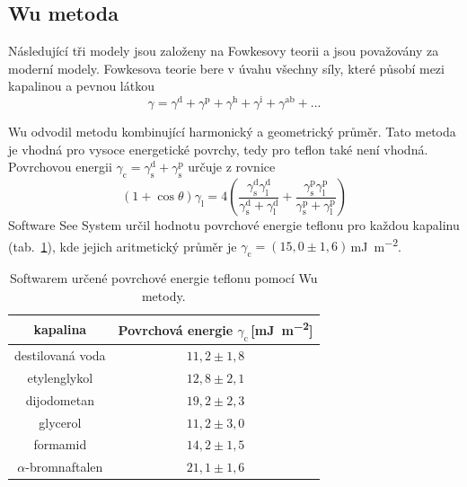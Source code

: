 \documentclass{protokol}
\begin{document}
\subsection{Wu metoda}
\par Následující tři modely jsou založeny na Fowkesovy teorii a jsou považovány 
za moderní modely. Fowkesova teorie bere v úvahu všechny síly, které působí 
mezi kapalinou a pevnou látkou 
\begin{equation}
\gamma = \gamma^\text{d} + \gamma^\text{p} +
\gamma^\text{h} + \gamma^\text{i} + \gamma^\text{ab} + ...
\end{equation}
\par Wu odvodil metodu kombinující harmonický a geometrický průměr. Tato metoda 
je vhodná pro vysoce energetické povrchy, tedy pro teflon také 
není vhodná. Povrchovou energii $\gamma_{\text{c}} = 
\gamma_{\text{s}}^{\text{d}} + \gamma_{\text{s}}^{\text{p}}$ určuje z rovnice
\begin{equation}
	\left(1+\cos\theta\right)\gamma_{\text{l}} = 
	4\left(\frac{\gamma_{\text{s}}^\text{d}\gamma_{\text{l}}^\text{d}}{\gamma_{\text{s}}^\text{d}
		+ \gamma_{\text{l}}^\text{d}} + 
	\frac{\gamma_{\text{s}}^\text{p}\gamma_{\text{l}}^\text{p}}{\gamma_{\text{s}}^\text{p}
		+ \gamma_{\text{l}}^\text{p}}\right)
\end{equation}
Software See System určil hodnotu povrchové energie teflonu pro každou 
kapalinu (tab.~\ref{table:Wu}), kde jejich aritmetický průměr je 
$\gamma_{\text{c}} = (15,0\pm1,6)$\,\si{\milli\joule\per\meter\squared}.

\begin{table}[h]
	\caption{Softwarem určené povrchové energie teflonu pomocí Wu metody.}
	\label{table:Wu}
	\begin{tabular}{|c|c|}\hline
		kapalina  & Povrchová energie 
		$\gamma_{\text{c}}$\,[\si{\milli\joule\per\meter\squared}] \\ \hline
		destilovaná voda & $11,2 \pm 1,8$     \\
		etylenglykol     & $12,8 \pm 2,1$     \\
		dijodometan      & $19,2 \pm 2,3$     \\
		glycerol         & $11,2 \pm 3,0$     \\
		formamid         & $14,2 \pm 1,5$     \\
		$\alpha$-bromnaftalen & $21,1 \pm 1,6$\\ \hline
	\end{tabular}
\end{table}
\end{document}
